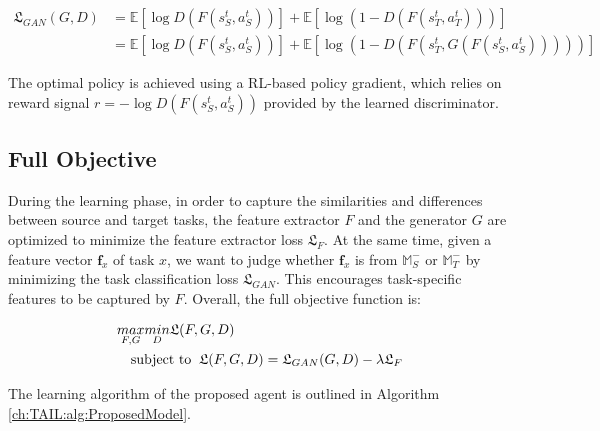 \begin{align}
  \mathfrak{L}_{GAN}(G, D) & =
  \mathbb{E}[
    \log{D(F(s^t_S, a^t_S))}
  ] + \mathbb{E}[
    \log{(1-D(F(s^t_T, a^t_T)))}
  ]                                        \\
                           & = \mathbb{E}[
    \log{D(F(s^t_S, a^t_S))}
  ] + \mathbb{E}[
    \log{(1-D(F(s^t_T, G(F(
      s^t_S, a^t_S
      )))))}
  ]
\end{align}

The optimal policy is achieved using a RL-based policy gradient,
which relies on reward signal $r=-\log{D(F(s^t_S, a^t_S))}$ provided by the learned discriminator.


\subsection{Full Objective}

During the learning phase,
in order to capture the similarities and differences between source and target tasks,
the feature extractor $F$ and the generator $G$ are optimized to minimize the feature extractor loss $\mathfrak{L}_F$.
At the same time,
given a feature vector $\mathbf{f}_x$ of task $x$,
we want to judge whether $\mathbf{f}_x$ is from $\mathbb{M}^-_S$ or $\mathbb{M}^-_T$ by minimizing the task classification loss $\mathfrak{L}_{GAN}$.
This encourages task-specific features to be captured by $F$.
Overall, the full objective function is:

\begin{align}
   & \underset{F, G}{max} \underset{D}{min} \mathfrak{L}(F, G, D) \\
   & \quad\text{subject to \:}
  \mathfrak{L}(F, G, D) = {\mathfrak{L}_{GAN}(G, D)} - \lambda\mathfrak{L}_F
\end{align}

The learning algorithm of the proposed agent is outlined in Algorithm \ref{ch:TAIL:alg:ProposedModel}.

